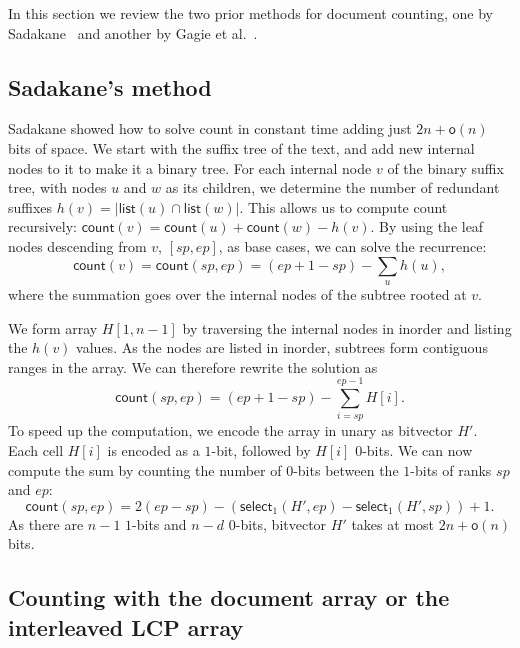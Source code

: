 \documentclass[11pt]{llncs}
\newcommand{\abs}[1]{\ensuremath{\lvert #1 \rvert}}
\newcommand{\doccount}{\textsf{count}}
\newcommand{\mcount}{\ensuremath{\mathsf{count}}}
\newcommand{\mlist}{\ensuremath{\mathsf{list}}}
\newcommand{\mselect}{\ensuremath{\mathsf{select}}}
\newcommand{\oh}{\ensuremath{\mathsf{o}}}
\newcommand{\onebit}{$1$\nobreakdash-bit}
\newcommand{\zerobit}{$0$\nobreakdash-bit}
\begin{document}
In this section we review the two prior methods for document counting, one by Sadakane~\cite{Sad07} and another by Gagie et al.~\cite{GKNPS13}.

\subsection{Sadakane's method}

Sadakane \cite{Sad07} showed how to solve \doccount{} in constant time adding just $2n+\oh(n)$ bits of space. We start with the suffix tree of the text, and add new internal nodes to it to make it a binary tree. For each internal node $v$ of the binary suffix tree, with nodes $u$ and $w$ as its children, we determine the number of redundant suffixes $h(v) = \abs{\mlist(u) \cap \mlist(w)}$. This allows us to compute \doccount{} recursively: $\mcount(v) = \mcount(u) + \mcount(w) - h(v)$. By using the leaf nodes descending from $v$, $[sp,ep]$, as base cases, we can solve the recurrence:
\begin{displaymath}
\mcount(v) = \mcount(sp,ep) = (ep + 1 - sp) - \sum_{u} h(u),
\end{displaymath}
where the summation goes over the internal nodes of the subtree rooted at $v$.

We form array $H[1,n-1]$ by traversing the internal nodes in inorder and listing the $h(v)$ values. As the nodes are listed in inorder, subtrees form contiguous ranges in the array. We can therefore rewrite the solution as
\begin{displaymath}
\mcount(sp,ep) = (ep + 1 - sp) - \sum_{i=sp}^{ep-1} H[i].
\end{displaymath}
To speed up the computation, we encode the array in unary as bitvector $H'$. Each cell $H[i]$ is encoded as a \onebit, followed by $H[i]$ \zerobit{}s. We can now compute the sum by counting the number of \zerobit{}s between the \onebit{}s of ranks $sp$ and $ep$:
\begin{displaymath}
\mcount(sp,ep) = 2(ep - sp) - (\mselect_{1}(H',ep) - \mselect_{1}(H',sp)) + 1.
\end{displaymath}
As there are $n-1$ \onebit{}s and $n-d$ \zerobit{}s, bitvector $H'$ takes at most $2n+\oh(n)$ bits.

\subsection{Counting with the document array or the interleaved LCP array}
\label{sec:ilcp}
\end{document}
